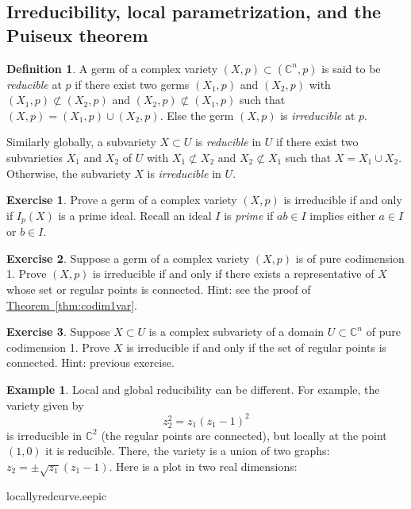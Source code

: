 \documentclass[12pt,openany]{book}
\newcommand{\C}{{\mathbb{C}}}
\newcommand{\myindex}[1]{#1\index{#1}}
\theoremstyle{plain}
\theoremstyle{remark}
\theoremstyle{definition}
\newtheorem{defn}[thm]{Definition}
\newenvironment{exbox}{%
    \def\FrameCommand{\vrule width 1pt \relax\hspace {10pt}}%
    \MakeFramed {\advance \hsize -\width \FrameRestore }%
}{%
    \endMakeFramed
}
\theoremstyle{exercise}
\newtheorem{exercise}{Exercise}[section]
\theoremstyle{example}
\newtheorem{example}[thm]{Example}
\newcommand{\thmref}[1]{\hyperref[#1]{Theorem~\ref*{#1}}}
\begin{document}
\subsection{Irreducibility, local parametrization, and the Puiseux
theorem}

\begin{defn}
A germ of a complex variety $(X,p) \subset (\C^n,p)$ is said to be
\emph{\myindex{reducible}} at $p$ if there exist
two germs $(X_1,p)$ and $(X_2,p)$ with
$(X_1,p) \not\subset (X_2,p)$ and
$(X_2,p) \not\subset (X_1,p)$ such that
$(X,p) = (X_1,p) \cup (X_2,p)$.
Else the germ $(X,p)$ is \emph{\myindex{irreducible}} at $p$.

Similarly globally, a subvariety $X \subset U$ is
\emph{reducible} in $U$ if there exist
two subvarieties
$X_1$ and $X_2$ of $U$ with
$X_1 \not\subset X_2$ and
$X_2 \not\subset X_1$ such that
$X = X_1 \cup X_2$.
Otherwise, the subvariety $X$ is \emph{irreducible} in $U$.
\end{defn}

\begin{exbox}
\begin{exercise}
Prove a germ of a complex variety $(X,p)$ is irreducible
if and only if $I_p(X)$ is a prime ideal.
Recall an ideal $I$ is \emph{prime}
if $ab \in I$ implies either $a \in I$ or $b
\in I$.
\end{exercise}

\begin{exercise}
Suppose a germ of a complex variety $(X,p)$ is of pure codimension 1.
Prove $(X,p)$ is irreducible if and only if there
exists a representative of $X$ whose set or regular points
is connected.  Hint: see the proof of \thmref{thm:codim1var}.
\end{exercise}

\begin{exercise}
Suppose $X \subset U$ is a complex subvariety of a domain $U \subset \C^n$
of pure codimension 1.
Prove $X$ is irreducible if and only if the set of regular points
is connected.  Hint: previous exercise.
\end{exercise}
\end{exbox}

\begin{example}
Local and global reducibility can be different.  For example,
the variety given by
\begin{equation*}
z_2^2 = z_1{(z_1-1)}^2
\end{equation*}
is irreducible in $\C^2$ (the regular points are connected), but locally
at the point
$(1,0)$ it is reducible.  There, the variety is
a union of two graphs: $z_2 = \pm \sqrt{z_1}(z_1-1)$.
Here is a plot in two real dimensions:

\begin{center}
\medskip
{locallyredcurve.eepic}
\bigskip
\end{center}
\end{example}
\end{document}
